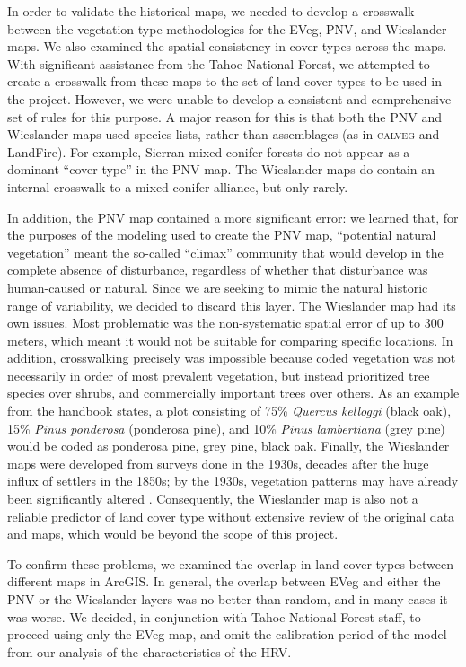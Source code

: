 In order to validate the historical maps, we needed to develop a crosswalk between the vegetation type methodologies for the EVeg, PNV, and Wieslander maps. We also examined the spatial consistency in cover types across the maps. With significant assistance from the Tahoe National Forest, we attempted to create a crosswalk from these maps to the set of land cover types to be used in the project. However, we were unable to develop a consistent and comprehensive set of rules for this purpose. A major reason for this is that both the PNV and Wieslander maps used species lists, rather than assemblages (as in \textsc{calveg} and LandFire). For example, Sierran mixed conifer forests do not appear as a dominant ``cover type'' in the PNV map. The Wieslander maps do contain an internal crosswalk to a mixed conifer alliance, but only rarely. 

In addition, the PNV map contained a more significant error: we learned that, for the purposes of the modeling used to create the PNV map, ``potential natural vegetation'' meant the so-called ``climax'' community that would develop in the complete absence of disturbance, regardless of whether that disturbance was human-caused or natural. Since we are seeking to mimic the natural historic range of variability, we decided to discard this layer. The Wieslander map had its own issues. Most problematic was the non-systematic spatial error of up to 300 meters, which meant it would not be suitable for comparing specific locations. In addition, crosswalking precisely was impossible because coded vegetation was not necessarily in order of most prevalent vegetation, but instead prioritized tree species over shrubs, and commercially important trees over others. As an example from the handbook states, a plot consisting of 75\% \emph{Quercus kelloggi} (black oak), 15\% \emph{Pinus ponderosa} (ponderosa pine), and 10\% \emph{Pinus lambertiana} (grey pine) would be coded as ponderosa pine, grey pine, black oak. Finally, the Wieslander maps were developed from surveys done in the 1930s, decades after the huge influx of settlers in the 1850s; by the 1930s, vegetation patterns may have already been significantly altered \citep{Thorne2006}. Consequently, the Wieslander map is also not a reliable predictor of land cover type without extensive review of the original data and maps, which would be beyond the scope of this project. 

To confirm these problems, we examined the overlap in land cover types between different maps in ArcGIS. In general, the overlap between EVeg and either the PNV or the Wieslander layers was no better than random, and in many cases it was worse. We decided, in conjunction with Tahoe National Forest staff, to proceed using only the EVeg map, and omit the calibration period of the model from our analysis of the characteristics of the HRV. %

